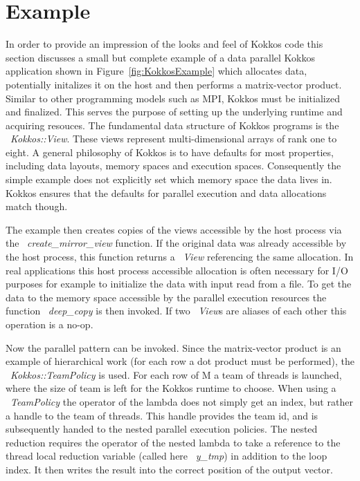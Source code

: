 \section{Example}\label{chap:kokkosExample}

In order to provide an impression of the looks and feel of Kokkos code this section discusses a small but complete example of a data parallel Kokkos application shown in Figure~\ref{fig:KokkosExample} which allocates data, potentially initalizes it on the host and then performs a matrix-vector product.
Similar to other programming models such as MPI, Kokkos must be initialized and finalized. 
This serves the purpose of setting up the underlying runtime and acquiring resouces.
The fundamental data structure of Kokkos programs is the ~\emph{Kokkos::View}.
These views represent multi-dimensional arrays of rank one to eight.
A general philosophy of Kokkos is to have defaults for most properties, including data layouts, memory spaces and execution spaces.
Consequently the simple example does not explicitly set which memory space the data lives in.
Kokkos ensures that the defaults for parallel execution and data allocations match though. 

The example then creates copies of the views accessible by the host process via the ~\emph{create\_mirror\_view} function. 
If the original data was already accessible by the host process, this function returns a ~\emph{View} referencing the same allocation.
In real applications this host process accessible allocation is often necessary for I/O purposes for example to initialize the data with input read from a file.
To get the data to the memory space accessible by the parallel execution resources the function ~\emph{deep\_copy} is then invoked.
If two ~\emph{View}s are aliases of each other this operation is a no-op. 

Now the parallel pattern can be invoked.
Since the matrix-vector product is an example of hierarchical work (for each row a dot product must be performed), the ~\emph{Kokkos::TeamPolicy} is used.
For each row of M a team of threads is launched, where the size of team is left for the Kokkos runtime to choose.
When using a ~\emph{TeamPolicy} the operator of the lambda does not simply get an index, but rather a handle to the team of threads. 
This handle provides the team id, and is subsequently handed to the nested parallel execution policies. 
The nested reduction requires the operator of the nested lambda to take a reference to the thread local reduction variable (called here ~\emph{y\_tmp}) in addition to the loop index.
It then writes the result into the correct position of the output vector. 

